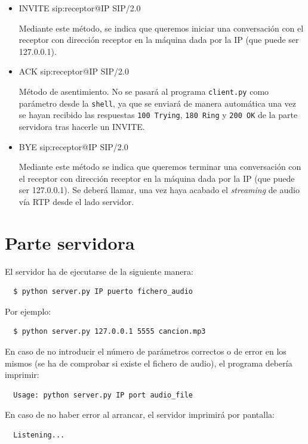 \documentclass[a4paper,11pt]{article}
\begin{document}
  \begin{itemize}
    \item INVITE sip:receptor@IP SIP/2.0

    Mediante este método, se indica que queremos iniciar una conversación con el receptor con dirección receptor en la máquina dada por la IP (que puede ser 127.0.0.1).


    \item ACK sip:receptor@IP SIP/2.0

    Método de asentimiento. No se pasará al programa \texttt{client.py} como parámetro desde
la \texttt{shell}, ya que se enviará de manera automática una vez se hayan recibido las respuestas \texttt {100 Trying}, \texttt{180 Ring} y \texttt{200 OK} de la parte servidora tras hacerle un INVITE.

    \item BYE sip:receptor@IP SIP/2.0

    Mediante este método se indica que queremos terminar una conversación con el receptor con dirección receptor en la máquina dada por la IP (que puede ser 127.0.0.1). Se deberá llamar, una vez haya acabado el \emph{streaming} de audio vía RTP desde el lado servidor.

  \end{itemize}


\section*{Parte servidora}

El servidor ha de ejecutarse de la siguiente manera:
\begin{verbatim}
  $ python server.py IP puerto fichero_audio
\end{verbatim}

Por ejemplo:
\begin{verbatim}
  $ python server.py 127.0.0.1 5555 cancion.mp3
\end{verbatim}

En caso de no introducir el número de parámetros correctos o de error en los mismos (se ha de comprobar si existe el fichero de audio), el programa debería imprimir:
\begin{verbatim}
  Usage: python server.py IP port audio_file
\end{verbatim}

En caso de no haber error al arrancar, el servidor imprimirá por pantalla:
\begin{verbatim}
  Listening...
\end{verbatim}
\end{document}
